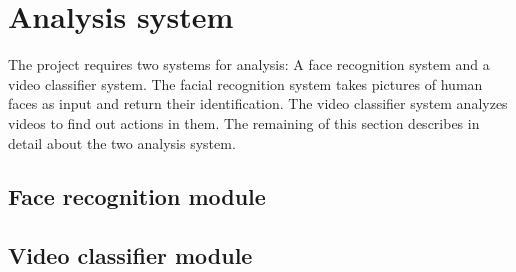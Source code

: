 \section{Analysis system}
The project requires two systems for analysis: A face recognition system and a video classifier system. The facial recognition system takes pictures of human faces as input and return their identification. The video classifier system analyzes videos to find out actions in them. The remaining of this section describes in detail about the two analysis system.
\subsection{Face recognition module}
\subsection{Video classifier module}
